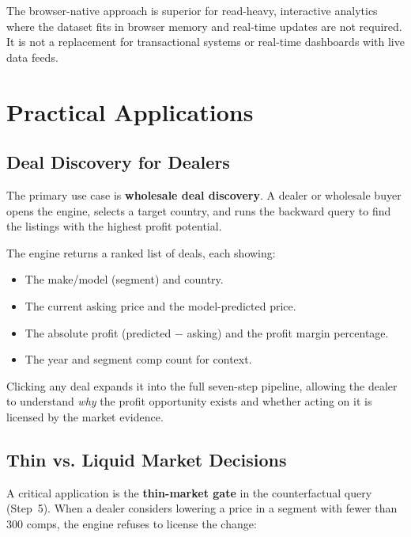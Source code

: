 \documentclass[11pt,a4paper,twoside]{book}
\begin{document}
The browser-native approach is superior for read-heavy, interactive analytics where the
dataset fits in browser memory and real-time updates are not required. It is not a
replacement for transactional systems or real-time dashboards with live data feeds.

\chapter{Practical Applications}

\section{Deal Discovery for Dealers}

The primary use case is \textbf{wholesale deal discovery}. A dealer or wholesale buyer opens
the engine, selects a target country, and runs the backward query to find the listings with
the highest profit potential.

The engine returns a ranked list of deals, each showing:

\begin{itemize}[leftmargin=*]
    \item The make/model (segment) and country.
    \item The current asking price and the model-predicted price.
    \item The absolute profit (predicted $-$ asking) and the profit margin percentage.
    \item The year and segment comp count for context.
\end{itemize}

Clicking any deal expands it into the full seven-step pipeline, allowing the dealer to
understand \textit{why} the profit opportunity exists and whether acting on it is licensed
by the market evidence.

\section{Thin vs. Liquid Market Decisions}

A critical application is the \textbf{thin-market gate} in the counterfactual query (Step~5).
When a dealer considers lowering a price in a segment with fewer than 300 comps, the engine
refuses to license the change:
\end{document}
